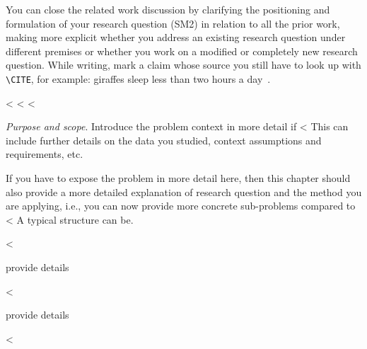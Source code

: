 {{{\begin{itemize}
        You can close the related work discussion by clarifying the positioning and formulation of your research question (SM2) in relation to all the prior work, making more explicit whether you address an existing research question under different premises or whether you work on a modified or completely new research question.
        While writing, mark a claim whose source you still have to look up with \verb|\CITE|, for example: giraffes sleep less than two hours a day~.
\end{itemize}

<%
<%
<%

\emph{Purpose and scope}.
Introduce the problem context in more detail if <%
This can include further details on the data you studied, context assumptions and requirements, etc.

If you have to expose the problem in more detail here, then this chapter should also provide a more detailed explanation of research question and the method you are applying, i.e., you can now provide more concrete sub-problems compared to <%
A typical structure can be.

<%

provide details

<%

provide details

<%

}}}
